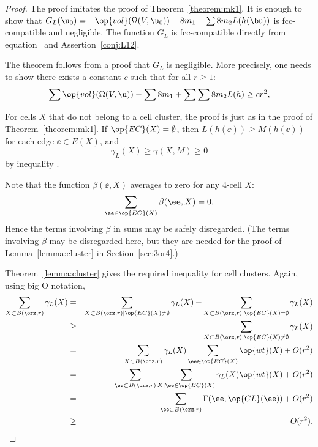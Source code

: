 \begin{proof} The proof imitates the proof of
Theorem~\ref{theorem:mk1}.  It is enough to show that $G_L( \u_0) =
-\op{vol}(\Omega(V, \u_0)) + 8 m_1 - \sum 8 m_2 L(h(\bu))$ is
fcc-compatible and negligible.  The function $G_L$ is fcc-compatible
directly from equation~ and Assertion~\ref{conj:L12}.

The theorem follows from a proof that $G_L$ is negligible.  More
precisely, one needs to show there exists a constant $c$ such that
for all $r\ge 1$:%
\begin{equation}\label{eqn:A2neg} 
\sum \op{vol}(\Omega(V, \u)) -\sum 8m_1 + \sum \sum 8 m_2 L(h) \ge c r^2,
\end{equation}

For cells $X$ that do not belong to a cell cluster,
the proof is just as in the proof of Theorem~\ref{theorem:mk1}.
If $\op{EC}(X)=\emptyset$, then 
$L(h(\ee))\ge M(h(\ee))$ for each edge $\ee\in E(X)$, and
\begin{displaymath}\gamma_L(X)\ge \gamma(X,M)\ge 0\end{displaymath} 
by inequality .

Note that the function $\beta(\ee,X)$ averages to zero for any $4$-cell $X$:
\begin{displaymath} 
\sum_{\ee\in \op{EC}(X)} \beta(\ee,X) = 0.
\end{displaymath}
Hence the terms involving $\beta$ in sums may be safely disregarded.
(The terms involving $\beta$ may be disregarded here, but they are
needed for the proof of Lemma~\ref{lemma:cluster} in
Section~\ref{sec:3or4}.)

Theorem~\ref{lemma:cluster} gives the required inequality for cell
clusters.  Again, using big O notation,
\begin{eqnarray*} 
\sum_{X\subset B(\orz,r)} \gamma_L(X) &=&
\sum_{X\subset B(\orz,r)\mid \op{EC}(X)\ne\emptyset} \gamma_L(X) +
\sum_{X\subset B(\orz,r)\mid \op{EC}(X)=\emptyset} \gamma_L(X) \vspace{6pt}\\
&\ge& \sum_{X\subset B(\orz,r)\mid \op{EC}(X)\ne\emptyset} \gamma_L(X)\vspace{6pt} \\
&=&\sum_{X\subset B(\orz,r)}\gamma_L(X)\sum_{\ee \in \op{EC}(X)}\op{wt}(X) + O(r^2)\vspace{6pt}\\
&=&\sum_{\ee\subset B(\orz,r)}\sum_{X\mid \ee \in \op{EC}(X)}\gamma_L(X)\op{wt}(X) + O(r^2)\vspace{6pt}\\
&=&\sum_{\ee\subset B(\orz,r)}\Gamma(\ee,\op{CL}(\ee)) + O(r^2)\vspace{6pt}\\
&\ge& ~~O(r^2).
\end{eqnarray*}



\end{proof}
